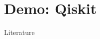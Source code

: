 \documentclass[10pt]{beamer}
\newcommand{\themename}{\textbf{\textsc{metropolis}}\xspace}
\begin{document}

    

\section{Demo: Qiskit}




\begin{frame}[allowframebreaks]{Literature}

\nocite{kueng2023quantum}
\nocite{balamurugan_2024}
\nocite{oemer_quantum_2000}





\end{frame}
\end{document}
